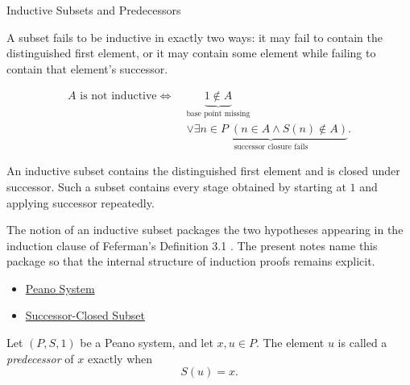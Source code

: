 \begin{topicbox}{Inductive Subsets and Predecessors}
\begin{remark*}
A subset fails to be inductive in exactly two ways: it may fail to contain the
distinguished first element, or it may contain some element while failing to
contain that element's successor.
\end{remark*}

\begin{remark*}
\[
\begin{aligned}
A \text{ is not inductive}
\Longleftrightarrow\;&
\underbrace{1 \notin A}_{\text{base point missing}}\\
&\lor
\underbrace{\exists n \in P\;(n \in A \land S(n) \notin A)}_{\text{successor closure fails}}.
\end{aligned}
\]
\end{remark*}

\begin{remark*}[Interpretation]
An inductive subset contains the distinguished first element and is closed
under successor. Such a subset contains every stage obtained by starting at
$1$ and applying successor repeatedly.
\end{remark*}

\begin{remark*}
The notion of an inductive subset packages the two hypotheses appearing in the
induction clause of Feferman's Definition 3.1
\citep{FefermanNumberSystems1964}. The present notes name this package so
that the internal structure of induction proofs remains explicit.
\end{remark*}

\begin{remark*}[Dependencies]
\begin{itemize}
  \item \hyperref[def:peano-system]{Peano System}
  \item \hyperref[def:successor-closed-subset]{Successor-Closed Subset}
\end{itemize}
\end{remark*}

\begin{tcolorbox}[colback=defbox, colframe=defborder, arc=2pt,
  left=6pt, right=6pt, top=4pt, bottom=4pt,
  title={\small\textbf{Definition (Predecessor in a Peano System)}} ,
  fonttitle=\small\bfseries]
\begin{definition}
\label{def:predecessor-in-peano-system}
Let $(P,S,1)$ be a Peano system, and let $x,u \in P$. The element $u$ is
called a \emph{predecessor} of $x$ exactly when
\[
S(u)=x.
\]
\end{definition}
\end{tcolorbox}


\end{topicbox}
